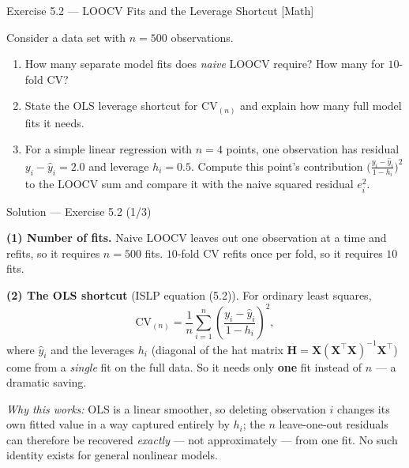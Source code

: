 \documentclass[aspectratio=169,11pt]{beamer}
\begin{document}
\begin{frame}{Exercise 5.2 --- LOOCV Fits and the Leverage Shortcut [Math]}\label{frm:ex52}
  \begin{exercise}
    Consider a data set with $n = 500$ observations.
    \begin{enumerate}
      \item How many separate model fits does \emph{naive} LOOCV
            require? How many for $10$-fold CV?
      \item State the OLS leverage shortcut for $\mathrm{CV}_{(n)}$ and
            explain how many full model fits it needs.
      \item For a simple linear regression with $n = 4$ points, one
            observation has residual $y_i - \hat y_i = 2.0$ and leverage
            $h_i = 0.5$. Compute this point's contribution
            $\bigl(\tfrac{y_i-\hat y_i}{1-h_i}\bigr)^2$ to the LOOCV sum
            and compare it with the naive squared residual $e_i^2$.
    \end{enumerate}
  \end{exercise}
\end{frame}

\begin{frame}{Solution --- Exercise 5.2 (1/3)}
  \begin{solutionbox}
    \textbf{(1) Number of fits.}
    Naive LOOCV leaves out one observation at a time and refits, so it
    requires $n = 500$ fits. $10$-fold CV refits once per fold, so it
    requires $10$ fits.

    \textbf{(2) The OLS shortcut} (ISLP equation (5.2)).
    For ordinary least squares,
    \[
      \mathrm{CV}_{(n)} = \frac{1}{n}\sum_{i=1}^n
        \left(\frac{y_i - \hat y_i}{1 - h_i}\right)^2 ,
    \]
    where $\hat y_i$ and the leverages $h_i$ (diagonal of the hat matrix
    $\mathbf{H} = \mathbf{X}(\mathbf{X}^\top\mathbf{X})^{-1}\mathbf{X}^\top$)
    come from a \emph{single} fit on the full data. So it needs only
    \textbf{one} fit instead of $n$ --- a dramatic saving.

    \emph{Why this works:} OLS is a linear smoother, so deleting
    observation $i$ changes its own fitted value in a way captured
    entirely by $h_i$; the $n$ leave-one-out residuals can therefore be
    recovered \emph{exactly} --- not approximately --- from one fit. No
    such identity exists for general nonlinear models.
  \end{solutionbox}
\end{frame}
\end{document}
